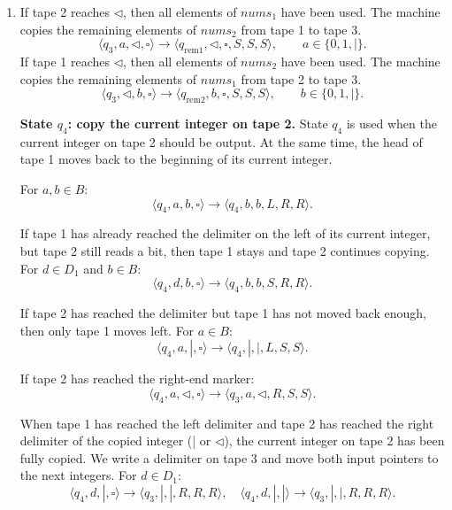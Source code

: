 \documentclass[12pt,a4paper]{article}
\makeatletter
\newtheorem*{solution}{Solution}
\theoremstyle{definition}
\renewenvironment{solution}[1][Solution] {\par\pushQED{\qed}\normalfont\topsep6\p@\@plus6\p@\relax\trivlist\item[\hskip\labelsep\bfseries#1\@addpunct{.}]\ignorespaces}{\popQED\endtrivlist\@endpefalse} \makeatother
\makeatother
\begin{document}
\begin{enumerate}
\begin{solution}
\begin{enumerate}
            If tape 2 reaches \(\triangleleft\), then all elements of \(nums_1\) have been used. The machine copies the remaining elements of \(nums_2\) from tape 1 to tape 3. \[ \langle q_3,a,\triangleleft,\square\rangle \to \langle q_{\mathrm{rem1}},\triangleleft,\square,S,S,S\rangle , \qquad a\in\{0,1,\vert\}. \] If tape 1 reaches \(\triangleleft\), then all elements of \(nums_2\) have been used. The machine copies the remaining elements of \(nums_1\) from tape 2 to tape 3. \[ \langle q_3,\triangleleft,b,\square\rangle \to \langle q_{\mathrm{rem2}},b,\square,S,S,S\rangle , \qquad b\in\{0,1,\vert\}. \]

            \medskip
            \noindent\textbf{State \(q_4\): copy the current integer on tape 2.} 
            State \(q_4\) is used when the current integer on tape 2 should be output. At the same time, the head of tape 1 moves back to the beginning of its current integer. 
            
            For \(a,b\in B\):
            \[
            \langle q_4,a,b,\square\rangle \to \langle q_4,b,b,L,R,R\rangle .
            \]
            
            If tape 1 has already reached the delimiter on the left of its current integer, but tape 2 still reads a bit, then tape 1 stays and tape 2 continues copying. For \(d\in D_1\) and \(b\in B\):
            \[
            \langle q_4,d,b,\square\rangle \to \langle q_4,b,b,S,R,R\rangle .
            \]
            
            If tape 2 has reached the delimiter but tape 1 has not moved back enough, then only tape 1 moves left. For \(a\in B\):
            \[
            \langle q_4,a,|,\square\rangle \to \langle q_4,|,|,L,S,S\rangle .
            \]
            
            If tape 2 has reached the right-end marker:
            \[
            \langle q_4,a,\triangleleft,\square\rangle \to \langle q_3,a,\triangleleft,R,S,S\rangle .
            \]
            
            When tape 1 has reached the left delimiter and tape 2 has reached the right delimiter of the copied integer (| or $\triangleleft$), the current integer on tape 2 has been fully copied. We write a delimiter on tape 3 and move both input pointers to the next integers. For \(d\in D_1\):
            \[
            \langle q_4,d,|,\square\rangle \to \langle q_3,|,|,R,R,R\rangle ,\quad
            \langle q_4,d,|,|\rangle \to \langle q_3,|,|,R,R,R\rangle .
            \]
            

\end{enumerate}
\end{solution}
\end{enumerate}
\end{document}
